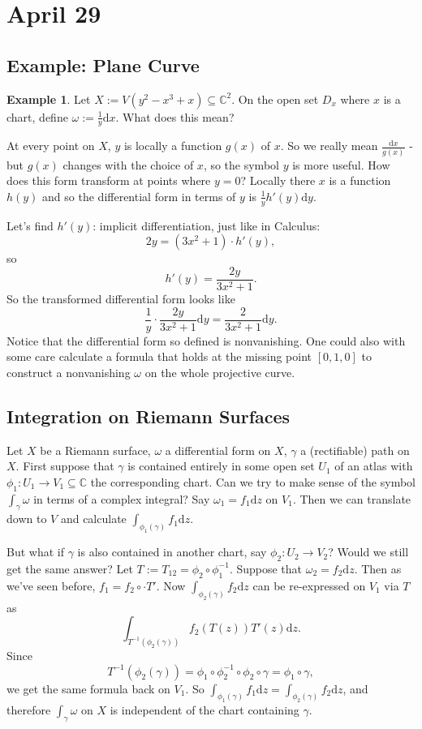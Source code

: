 \documentclass[12pt]{article}
\newcommand{\cx}{\mathbb{C}}
\newcommand\inv[1]{#1^{-1}}
\newcommand{\paren}[1]{\left( #1 \right)}
\theoremstyle{definition}
\newtheorem{example}[theorem]{Example}
\theoremstyle{remark}
\begin{document}
\section{April 29}
\subsection{Example: Plane Curve}
\begin{example}
    Let $X := V(y^2 - x^3 + x) \subseteq \cx^2$. On the open set $D_x$ where $x$ is a chart, define $\omega := \frac{1}{y} \mathrm{d}x$. What does this mean?
    
    At every point on $X$, $y$ is locally a function $g(x)$ of $x$. So we really mean $\frac{\mathrm{d}x}{g(x)}$ - but $g(x)$ changes with the choice of $x$, so the symbol $y$ is more useful. How does this form transform at points where $y = 0$? Locally there $x$ is a function $h(y)$ and so the differential form in terms of $y$ is $\frac{1}{y}h'(y) \mathrm{d}y$.
    
    Let's find $h'(y)$: implicit differentiation, just like in Calculus:
    \[
        2y = (3x^2 + 1) \cdot h'(y),
    \]
    so 
    \[
        h'(y) = \frac{2y}{3x^2 + 1}.
    \]
    So the transformed differential form looks like 
    \[
        \frac{1}{y} \cdot \frac{2y}{3x^2 + 1} \mathrm{d}y = \frac{2}{3x^2 + 1} \mathrm{d}y.
    \]
    Notice that the differential form so defined is nonvanishing. One could also with some care calculate a formula that holds at the missing point $[0,1,0]$ to construct a nonvanishing $\omega$ on the whole projective curve.
\end{example}
\subsection{Integration on Riemann Surfaces}
Let $X$ be a Riemann surface, $\omega$ a differential form on $X$, $\gamma$ a (rectifiable) path on $X$. First suppose that $\gamma$ is contained entirely in some open set $U_1$ of an atlas with $\phi_1 : U_1 \to V_1 \subseteq \cx$ the corresponding chart. Can we try to make sense of the symbol $\int_{\gamma} \omega$ in terms of a complex integral? Say $\omega_1 = f_1 \mathrm{d}z$ on $V_1$. Then we can translate down to $V$ and calculate $\int_{\phi_1(\gamma)} f_1 \mathrm{d}z$.

But what if $\gamma$ is also contained in another chart, say $\phi_2 : U_2 \to V_2$? Would we still get the same answer? Let $T := T_{12} = \phi_2 \circ \inv{\phi_1}$. Suppose that $\omega_2 = f_2 \mathrm{d}z$. Then as we've seen before, $f_1 = f_2 \circ \cdot T'$. Now $\int_{\phi_2(\gamma)} f_2 \mathrm{d}z$ can be re-expressed on $V_1$ via $T$ as 
\[
    \int_{\inv{T} \paren{ \phi_2(\gamma) }} f_2 \paren{ T(z) } T'(z) \mathrm{d}z.
\]
Since 
\[
    \inv{T} \paren{ \phi_2(\gamma) } = \phi_1 \circ \inv{\phi_2} \circ \phi_2 \circ \gamma = \phi_1 \circ \gamma,
\]
we get the same formula back on $V_1$. So $\int_{\phi_1(\gamma)} f_1 \mathrm{d}z = \int_{\phi_2(\gamma)} f_2 \mathrm{d}z$, and therefore $\int_{\gamma} \omega$ on $X$ is independent of the chart containing $\gamma$.
\end{document}
